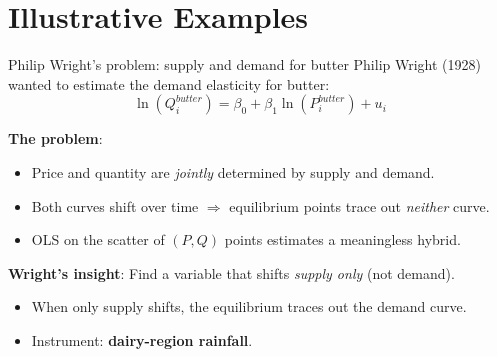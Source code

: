 \documentclass[10pt]{beamer}
\begin{document}
\section{Illustrative Examples}

\begin{frame}{Philip Wright's problem: supply and demand for butter}
\label{slide:wright}
Philip Wright (1928) wanted to estimate the \alert{demand elasticity for butter}:
\[
\ln(Q_i^{butter}) = \beta_0 + \beta_1 \ln(P_i^{butter}) + u_i
\]

\pause
\textbf{The problem}:
\begin{itemize}
  \item Price and quantity are \emph{jointly} determined by supply and demand.
  \item Both curves shift over time $\Rightarrow$ equilibrium points trace out \emph{neither} curve.
  \item OLS on the scatter of $(P,Q)$ points estimates a meaningless hybrid.
\end{itemize}

\pause
\textbf{Wright's insight}: Find a variable that shifts \emph{supply only} (not demand).
\begin{itemize}
  \item When only supply shifts, the equilibrium traces out the \alert{demand curve}.
  \item Instrument: \textbf{dairy-region rainfall}.
\end{itemize}
\end{frame}
\end{document}
